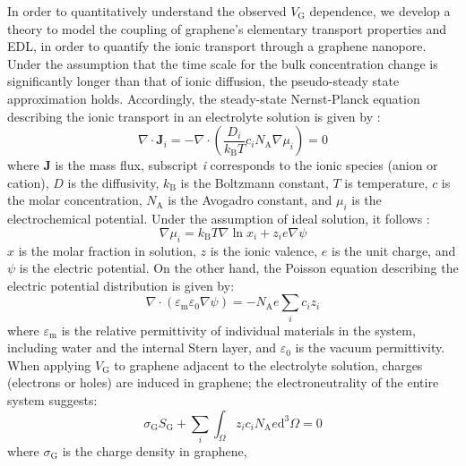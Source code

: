 \documentclass[journal=langd5,email=true, hyperref=true, keywords=false]{achemso}
\begin{document}
In order to quantitatively understand the observed $V_{\mathrm{G}}$
dependence, we develop a theory to model the coupling of graphene's
elementary transport properties and EDL, in order to quantify the
ionic transport through a graphene nanopore. Under the assumption that
the time scale for the bulk concentration change is significantly
longer than that of ionic diffusion, the pseudo-steady state
approximation holds. Accordingly, the steady-state Nernst-Planck
equation describing the ionic transport in an electrolyte solution is
given by \cite{MacGillivray_1968}:
\begin{equation}
  \label{eq:pnp}
  \nabla \cdot \boldsymbol{J}_{i} = -\nabla \cdot (\frac{D_{i}}{k_{\mathrm{B}}T} c_{i} N_{\mathrm{A}} \nabla \mu_{i}) = 0
\end{equation}
where $\boldsymbol{J}$ is the mass flux, subscript \textit{i}
corresponds to the ionic species (anion or cation), $D$ is the diffusivity,
$k_{\mathrm{B}}$ is the Boltzmann constant, $T$ is temperature, $c$ is
the molar concentration, $N_{\mathrm{A}}$ is the Avogadro constant,
and $\mu_{i}$ is the electrochemical potential. Under the assumption
of ideal solution, it follows \cite{Kilic_2007}:
\begin{equation}
  \label{eq:mu}
  \nabla \mu_{i} = k_{\mathrm{B}} T \nabla \ln x_{i} + z_{i} e \nabla \psi
\end{equation}
 $x$ is the molar fraction in solution, $z$ is the ionic valence,
$e$ is the unit charge, and $\psi$ is the electric potential. On the
other hand, the Poisson equation describing the electric potential
distribution is given by:
\begin{equation}
  \label{eq:poisson}
  \nabla \cdot (\varepsilon_{\mathrm{m}} \varepsilon_{0} \nabla \psi)
  =
  - N_{\mathrm{A}} e \sum_{i} c_{i} z_{i}
\end{equation}
where $\varepsilon_{\mathrm{m}}$ is the relative permittivity of
individual materials in the system, including water and the internal
Stern layer\cite{Tian_2017}, and
$\varepsilon_{0}$ is the vacuum permittivity. When applying
$V_{\mathrm{G}}$ to graphene adjacent to the electrolyte solution,
charges (electrons or holes) are induced in graphene; the
electroneutrality of the entire system suggests:
\begin{equation}
  \label{eq:electro-neutral}
  \sigma_{\mathrm{G}} S_{\mathrm{G}} + \sum_{i} \int_{\Omega} z_{i} c_{i} N_{\mathrm{A}} e \mathrm{d}^{3} \Omega= 0
\end{equation}
where $\sigma_{\mathrm{G}}$ is the charge density in graphene,
\end{document}
